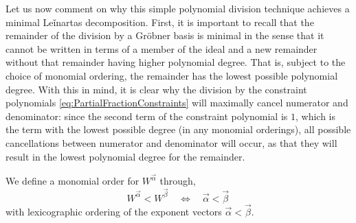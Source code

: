 Let us now comment on why this simple polynomial division technique achieves a
minimal Leǐnartas decomposition. First, it is important to recall that
the remainder of the division by a Gröbner basis is minimal in the sense that
it cannot be written in terms of a member of the ideal and a new remainder
without that remainder having higher polynomial degree. That is, subject to the
choice of monomial ordering, the remainder has the lowest possible polynomial
degree. With this in mind, it is clear why the division by the constraint
polynomials \eqref{eq:PartialFractionConstraints} will maximally cancel
numerator and denominator: since the second term of the constraint polynomial is
$1$, which is the term with the lowest possible degree (in any monomial orderings),
all possible cancellations between numerator and denominator will occur, as that they
will result in the lowest polynomial degree for the remainder.

We define a monomial order for $W^{\vec\alpha}$ through,
\begin{equation}
  \label{eq:orderingNotation}
  W^{\vec\alpha} < W^{\vec\beta}  \quad \Leftrightarrow \quad \vec\alpha < \vec\beta \,
\end{equation}
with lexicographic ordering of the exponent vectors $\vec\alpha < \vec\beta$.


